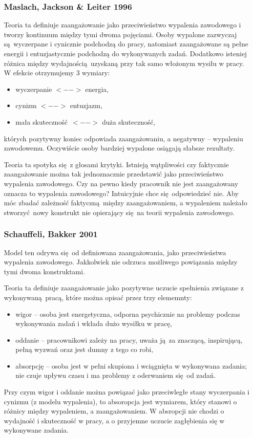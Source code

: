 \subsubsection{Maslach, Jackson \& Leiter 1996}
Teoria ta definiuje zaangażowanie jako przeciwieństwo wypalenia zawodowego i tworzy kontinuum między tymi dwoma pojęciami. Osoby wypalone zazwyczaj są wyczerpane i cynicznie podchodzą do pracy, natomiast zaangażowane są pełne energii i entuzjastycznie podchodzą do wykonywanych zadań. Dodatkowo isteniej różnica między wydajnością uzyskaną przy tak samo włożonym wysiłu w pracy. W efekcie otrzymujemy 3 wymiary:
\begin{itemize}
\item wyczerpanie $<-->$ energia,
\item cynizm $<-->$ entuzjazm,
\item mała skuteczność $<-->$ duża skuteczność,
\end{itemize}
których pozytywny koniec odpowiada zaangażowaniu, a negatywny -- wypaleniu zawodowemu. Oczywiście osoby bardziej wypalone osiągają słabsze rezultaty.

Teoria ta spotyka się z głosami krytyki. Istnieją wątpliwości czy faktycznie zaangażowanie można tak jednoznacznie przedstawić jako przeciwieństwo wypalenia zawodowego. Czy na pewno kiedy pracownik nie jest zaangażowany oznacza to wypalenia zawodowego? Intuicyjnie chce się odpowiedzieć nie. Aby móc zbadać zależność faktyczną między zaangażowaniem, a wypaleniem należało stworzyć nowy konstrukt nie opierający się na teorii wypalenia zawodowego.

\subsubsection{Schauffeli, Bakker 2001}
Model ten odrywa się od definiowana zaangażowania, jako przeciwieństwa wypalenia zawodowego. Jakkolwiek nie odrzuca możliwego powiązania między tymi dwoma konstruktami. 

Teoria ta definiuje zaangażowanie jako pozytywne uczucie spełnienia związane z wykonywaną pracą, które można opisać przez trzy elememnty:
\begin{itemize}
\item wigor -- osoba jest energetyczna, odporna psychicznie na problemy podczas wykonywania zadań i wkłada dużo wysiłku w pracę,
\item oddanie -- pracownikowi zależy na pracy, uważa ją za znaczącą, inspirującą, pełną wyzwań oraz jest dumny z tego co robi,
\item absorpcję -- osoba jest w pełni skupiona i wciągnięta w wykonywana zadania; nie czuje upływu czasu i ma problemy z oderwaniem się od zadań.
\end{itemize}
Przy czym wigor i oddanie można powiązać jako przeciwległe stany wyczerpania i cynizmu (z modelu wypalenia), to absoropcja jest wymiarem, który stanowi o różnicy między wypaleniem, a zaangażowaniem. W absropcji nie chodzi o wydajność i skuteczność w pracy, a o przyjemne uczucie zagłębienia się w wykonywane zadania.

